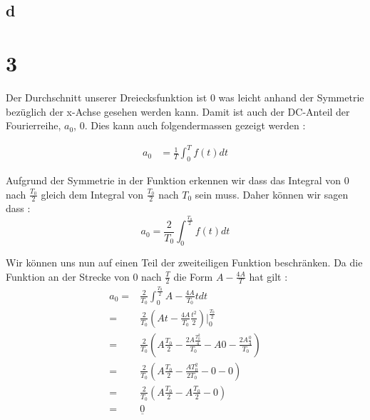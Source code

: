 \documentclass{article}
\begin{document}
    \subsection*{d}
    \section*{3}
    Der Durchschnitt unserer Dreiecksfunktion ist $0$ was leicht anhand der Symmetrie bezüglich der x-Achse gesehen werden kann. Damit ist auch der DC-Anteil der Fourierreihe, $a_0$, $0$.
    Dies kann auch folgendermassen gezeigt werden :
    
    \begin{eqnarray*}
        a_{0} &=\frac{1}{T}\int_{0}^{T}f(t)dt 
    \end{eqnarray*}

Aufgrund der Symmetrie in der Funktion erkennen wir dass das Integral von $0$ nach $\frac{T_0}{2}$ gleich dem Integral von $\frac{T_0}{2}$ nach $T_0$ sein muss. Daher können wir sagen dass :
\begin{equation}
    a_0=\frac{2}{T_0}\int_{0}^{\frac{T_0}{2}}f(t)dt 
\end{equation}

Wir können uns nun auf einen Teil der zweiteiligen Funktion beschränken. Da die Funktion an der Strecke von $0$ nach $\frac{T}{2}$ die Form $A-\frac{4A}{T}$ hat gilt :
\begin{eqnarray*}
    a_0=&\frac{2}{T_0}\int_{0}^{\frac{T_0}{2}}A-\frac{4A}{T_0}tdt \\
    =&\frac{2}{T_0}(At-\frac{4A}{T_0}\frac{t^2}{2})\big |_0^{\frac{T_0}{2}}\\
    =&\frac{2}{T_0}(A\frac{T_0}{2}-\frac{2A\frac{T_0^2}{4}}{T_0}-A0-\frac{2A\frac{0}{4}}{T_0})\\
    =&\frac{2}{T_0}(A\frac{T_0}{2}-\frac{AT_0^2}{2T_0}-0-0)\\
    =&\frac{2}{T_0}(A\frac{T_0}{2}-A\frac{T_0}{2}-0) \\ =& \underline{0}
\end{eqnarray*}

\pagebreak
\end{document}
